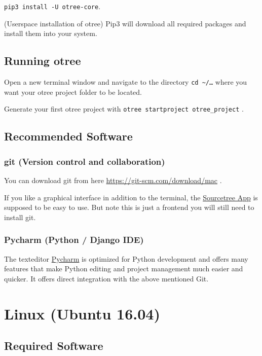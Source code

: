 \documentclass[11pt]{article}
\newcommand{\maccode}[1]{{\footnotesize\color{black}\tt #1}}
\begin{document}
\maccode{pip3 install -U otree-core}. 

(Userspace installation of otree) Pip3 will download all required packages and install them into your system.

\subsection{Running otree}
\label{sec:orgheadline16}

Open a new terminal window and navigate to the directory \maccode{cd \textasciitilde/\ldots} where you want your otree project folder to be located.

Generate your first otree project with \maccode{otree startproject otree\_project} .

\subsection{Recommended Software}
\label{sec:orgheadline19}

\subsubsection{git (Version control and collaboration)}
\label{sec:orgheadline17}

You can download git from here \url{https://git-scm.com/download/mac} .

If you like a graphical interface in addition to the terminal, the \href{https://www.sourcetreeapp.com/}{Sourcetree App} is supposed to be easy to use. But note this is just a frontend you will still need to install git.

\subsubsection{Pycharm (Python / Django IDE)}
\label{sec:orgheadline18}
The texteditor \href{http://www.jetbrains.com/pycharm/}{Pycharm} is optimized for Python development and offers many features that make Python editing and project management much easier and quicker. It offers direct integration with the above mentioned Git.


\newpage

\section{Linux (Ubuntu 16.04)}
\label{sec:orgheadline28}

\subsection{Required Software}
\label{sec:orgheadline23}
\end{document}
